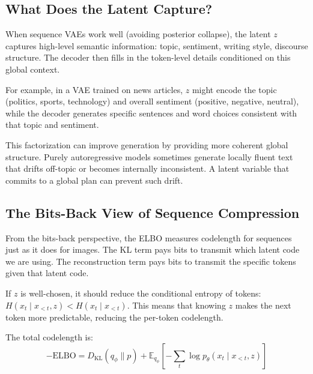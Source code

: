 \subsection{What Does the Latent Capture?}

When sequence VAEs work well (avoiding posterior collapse), the latent $z$ captures high-level semantic information: topic, sentiment, writing style, discourse structure. The decoder then fills in the token-level details conditioned on this global context.

\vspace{0.3cm}

For example, in a VAE trained on news articles, $z$ might encode the topic (politics, sports, technology) and overall sentiment (positive, negative, neutral), while the decoder generates specific sentences and word choices consistent with that topic and sentiment.

\vspace{0.3cm}

This factorization can improve generation by providing more coherent global structure. Purely autoregressive models sometimes generate locally fluent text that drifts off-topic or becomes internally inconsistent. A latent variable that commits to a global plan can prevent such drift.

\vspace{1.5em}

\subsection{The Bits-Back View of Sequence Compression}

From the bits-back perspective, the ELBO measures codelength for sequences just as it does for images. The KL term pays bits to transmit which latent code we are using. The reconstruction term pays bits to transmit the specific tokens given that latent code.

\vspace{0.3cm}

If $z$ is well-chosen, it should reduce the conditional entropy of tokens: $H(x_t \mid x_{<t}, z) < H(x_t \mid x_{<t})$. This means that knowing $z$ makes the next token more predictable, reducing the per-token codelength.

\vspace{0.3cm}

The total codelength is:
%
\begin{equation}
-\text{ELBO} = D_{\text{KL}}(q_\phi \| p) + \mathbb{E}_{q_\phi} \left[ -\sum_t \log p_\theta(x_t \mid x_{<t}, z) \right]
\end{equation}

